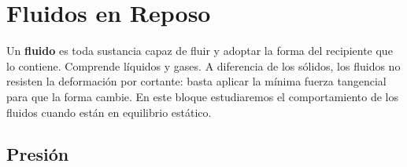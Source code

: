 
\renewcommand{\tema}{Fluidos}

\section{Fluidos en Reposo}

\begin{seccion}
Un \textbf{fluido} es toda sustancia capaz de fluir y adoptar la forma del recipiente que lo contiene. Comprende líquidos y gases. A diferencia de los sólidos, los fluidos no resisten la deformación por cortante: basta aplicar la mínima fuerza tangencial para que la forma cambie. En este bloque estudiaremos el comportamiento de los fluidos cuando están en equilibrio estático.
\end{seccion}

\subsection{Presión}

